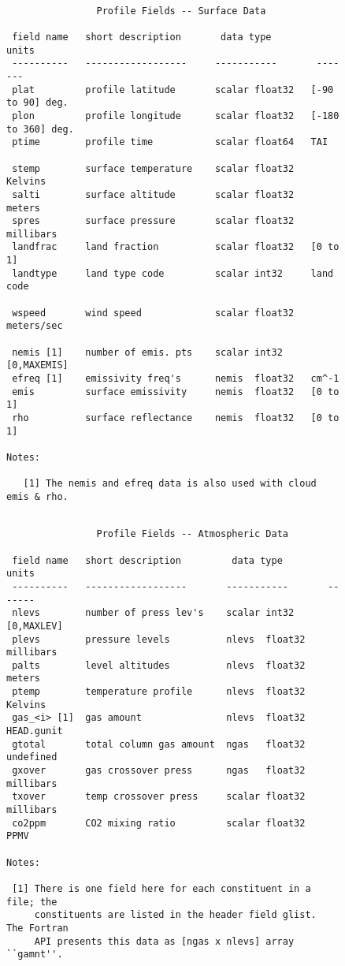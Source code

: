 \documentclass[12pt]{article}
\begin{document}
\begin{figure}
{\small
\begin{verbatim}

                Profile Fields -- Surface Data
  
 field name   short description       data type         units
 ----------   ------------------     -----------       -------
 plat         profile latitude       scalar float32   [-90 to 90] deg.
 plon         profile longitude      scalar float32   [-180 to 360] deg.
 ptime        profile time           scalar float64   TAI  

 stemp        surface temperature    scalar float32   Kelvins
 salti        surface altitude       scalar float32   meters
 spres        surface pressure       scalar float32   millibars
 landfrac     land fraction          scalar float32   [0 to 1]
 landtype     land type code         scalar int32     land code

 wspeed       wind speed             scalar float32   meters/sec

 nemis [1]    number of emis. pts    scalar int32     [0,MAXEMIS]
 efreq [1]    emissivity freq's      nemis  float32   cm^-1
 emis         surface emissivity     nemis  float32   [0 to 1]
 rho          surface reflectance    nemis  float32   [0 to 1]

Notes:

   [1] The nemis and efreq data is also used with cloud emis & rho.

\end{verbatim}
}
\end{figure}
\begin{figure}
{\small
\begin{verbatim}

                Profile Fields -- Atmospheric Data

 field name   short description         data type         units
 ----------   ------------------       -----------       -------
 nlevs        number of press lev's    scalar int32     [0,MAXLEV]
 plevs        pressure levels          nlevs  float32   millibars
 palts        level altitudes          nlevs  float32   meters
 ptemp        temperature profile      nlevs  float32   Kelvins
 gas_<i> [1]  gas amount               nlevs  float32   HEAD.gunit
 gtotal       total column gas amount  ngas   float32   undefined
 gxover       gas crossover press      ngas   float32   millibars
 txover       temp crossover press     scalar float32   millibars
 co2ppm       CO2 mixing ratio         scalar float32   PPMV

Notes:

 [1] There is one field here for each constituent in a file; the 
     constituents are listed in the header field glist.  The Fortran 
     API presents this data as [ngas x nlevs] array ``gamnt''.

\end{verbatim}
}
\end{figure}
\end{document}
